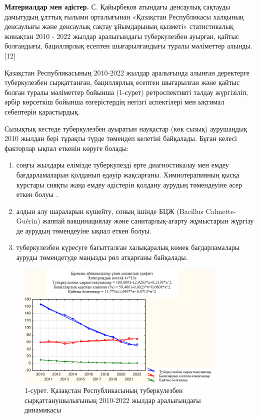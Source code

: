 \begin{multicols}{2}
{\bfseries Материалдар мен әдістер.} С. Қайырбеков атындағы денсаулық
сақтауды дамытудың ұлттық ғылыми орталығынан «Қазақстан Республикасы
халқының денсаулығы және денсаулық сақтау ұйымдарының қызметі»
статистикалық жинақтан 2010 - 2022 жылдар аралығындағы туберкулезбен
ауырған, қайтыс болғандығы, бациллярлық есептен шығарылғандығы туралы
мәліметтер алынды. {[}12{]}

Қазақстан Республикасының 2010-2022 жылдар аралығында алынған деректерге
туберкулезбен сырқаттанған, бациллярлық есептен шығарылған және қайтыс
болған туралы мәліметтер бойынша (1-сурет) ретроспективті талдау
жүргізіліп, әрбір көрсеткіш бойынша өзгерістердің негізгі аспектілері
мен ықтимал себептерін қарастырдық.

Сызықтық кестеде туберкулезбен ауыратын науқастар (көк сызық) аурушаңдық
2010 жылдан бері тұрақты түрде төмендеп келетіні байқалады. Бұған келесі
факторлар ықпал еткенін көруге болады:

\begin{enumerate}
\def\labelenumi{\arabic{enumi})}\setlength{\itemindent}{1cm}

\item
  соңғы жылдары елімізде туберкулезді ерте диагностикалау мен емдеу
  бағдарламаларын қолданып едәуір жақсарғаны. Химиотерапияның қысқа
  курстары сияқты жаңа емдеу әдістерін қолдану аурудың төмендеуіне әсер
  еткен болуы .
\item
  алдын алу шараларын күшейту, соның ішінде БЦЖ (Bacillus
  Calmette-Guérin) жаппай вакцинациялау және санитарлық-ағарту
  жұмыстарын жүргізу де аурудың төмендеуіне ықпал еткен болуы.
\item
  туберкулезбен күресуге бағытталған халықаралық көмек бағдарламалары
  ауруды төмендетуде маңызды рөл атқарғаны байқалады.
\end{enumerate}

\end{multicols}

\begin{figure}[H]
	\centering
	\includegraphics[width=0.9\textwidth]{assets/168}
	\caption*{1-сурет. Қазақстан Республикасының туберкулезбен
  сырқаттанушылығының 2010-2022 жылдар аралығындағы динамикасы}
\end{figure}


